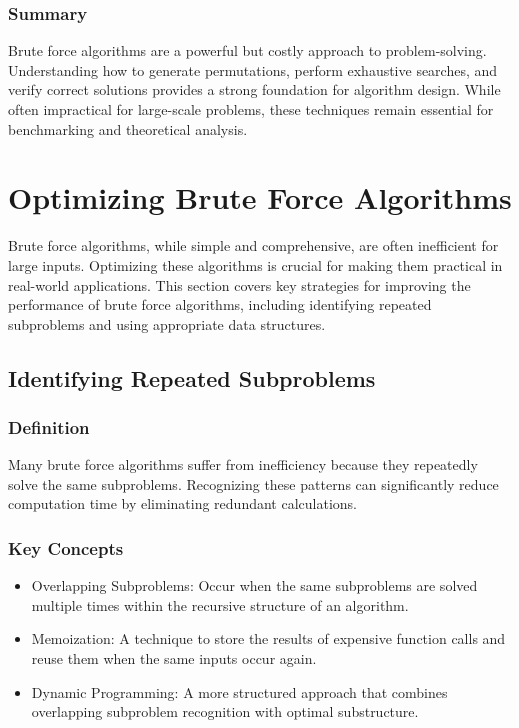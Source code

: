 \documentclass[12pt]{article}
\begin{document}
    \subsubsection{Summary}
    Brute force algorithms are a powerful but costly approach to problem-solving. Understanding how to generate permutations, perform exhaustive searches, and verify correct solutions provides a strong foundation for algorithm design. While often impractical for large-scale problems, these techniques remain essential for benchmarking and theoretical analysis.

    \section{Optimizing Brute Force Algorithms}
    Brute force algorithms, while simple and comprehensive, are often inefficient for large inputs. Optimizing these algorithms is crucial for making them practical in real-world applications. This section covers key strategies for improving the performance of brute force algorithms, including identifying repeated subproblems and using appropriate data structures.

    \subsection{Identifying Repeated Subproblems}

    \subsubsection{Definition}
    Many brute force algorithms suffer from inefficiency because they repeatedly solve the same subproblems. Recognizing these patterns can significantly reduce computation time by eliminating redundant calculations.

    \subsubsection{Key Concepts}
        \begin{itemize}
            \item Overlapping Subproblems: Occur when the same subproblems are solved multiple times within the recursive structure of an algorithm.
            \item Memoization: A technique to store the results of expensive function calls and reuse them when the same inputs occur again.
            \item Dynamic Programming: A more structured approach that combines overlapping subproblem recognition with optimal substructure.
        \end{itemize}
\end{document}
